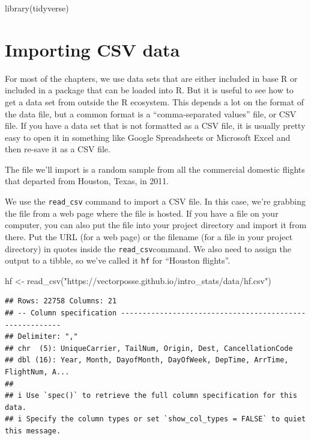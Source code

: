 \documentclass[
]{book}
\newenvironment{Shaded}{\begin{snugshade}}{\end{snugshade}}
\newcommand{\FunctionTok}[1]{\textcolor[rgb]{0.00,0.00,0.00}{#1}}
\newcommand{\NormalTok}[1]{#1}
\newcommand{\OtherTok}[1]{\textcolor[rgb]{0.56,0.35,0.01}{#1}}
\newcommand{\StringTok}[1]{\textcolor[rgb]{0.31,0.60,0.02}{#1}}
\begin{document}
\begin{Shaded}
\begin{Highlighting}[]
\FunctionTok{library}\NormalTok{(tidyverse)}
\end{Highlighting}
\end{Shaded}

\hypertarget{manipulating-csv}{%
\section{Importing CSV data}\label{manipulating-csv}}

For most of the chapters, we use data sets that are either included in base R or included in a package that can be loaded into R. But it is useful to see how to get a data set from outside the R ecosystem. This depends a lot on the format of the data file, but a common format is a ``comma-separated values'' file, or CSV file. If you have a data set that is not formatted as a CSV file, it is usually pretty easy to open it in something like Google Spreadsheets or Microsoft Excel and then re-save it as a CSV file.

The file we'll import is a random sample from all the commercial domestic flights that departed from Houston, Texas, in 2011.

We use the \texttt{read\_csv} command to import a CSV file. In this case, we're grabbing the file from a web page where the file is hosted. If you have a file on your computer, you can also put the file into your project directory and import it from there. Put the URL (for a web page) or the filename (for a file in your project directory) in quotes inside the \texttt{read\_csv}command. We also need to assign the output to a tibble, so we've called it \texttt{hf} for ``Houston flights''.

\begin{Shaded}
\begin{Highlighting}[]
\NormalTok{hf }\OtherTok{\textless{}{-}} \FunctionTok{read\_csv}\NormalTok{(}\StringTok{"https://vectorposse.github.io/intro\_stats/data/hf.csv"}\NormalTok{)}
\end{Highlighting}
\end{Shaded}

\begin{verbatim}
## Rows: 22758 Columns: 21
## -- Column specification --------------------------------------------------------
## Delimiter: ","
## chr  (5): UniqueCarrier, TailNum, Origin, Dest, CancellationCode
## dbl (16): Year, Month, DayofMonth, DayOfWeek, DepTime, ArrTime, FlightNum, A...
## 
## i Use `spec()` to retrieve the full column specification for this data.
## i Specify the column types or set `show_col_types = FALSE` to quiet this message.
\end{verbatim}
\end{document}
